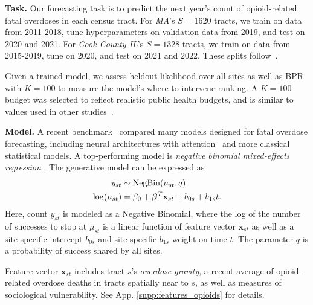 
\textbf{Task.} Our forecasting task is to predict the next year's count of opioid-related fatal overdoses in each census tract. For \emph{MA}'s $S{=}1620$ tracts, we train on data from 2011-2018, tune hyperparameters on validation data from 2019, and test on 2020 and 2021. For \emph{Cook County IL}'s $S{=}1328$ tracts, we train on data from 2015-2019, tune on 2020, and test on 2021 and 2022. 
These splits follow~\citet{heutonSpatiotemporalForecastingOpioidrelated2024}.

Given a trained model, we assess heldout likelihood over all sites as well as BPR with $K{=}100$ to measure the model's where-to-intervene ranking. A $K{=}100$ budget was selected to reflect realistic public health budgets, and is similar to values used in other studies~\citep{marshallPreventingOverdoseUsing2022}.



\textbf{Model.}
A recent benchmark~\citep{heutonSpatiotemporalForecastingOpioidrelated2024} compared many models designed for fatal overdose forecasting, including
neural architectures with attention~\citep{ertugrul_castnet_2019} and more classical statistical models. 
A top-performing model is \emph{negative binomial mixed-effects regression} \citep{marks_identifying_2021}.
The generative model can be expressed as
\begin{align}
    \label{eq:neg_binom_mixed_effects}
    y_{st} &\sim \text{NegBin}(\mu_{st}, q),
    \\ \notag
	\log(\mu_{st}) &= \beta_0 + \boldsymbol{\beta}^T\mathbf{x}_{st} + b_{0s} + b_{1s}t.
\end{align}
Here, count $y_{st}$ is modeled as a Negative Binomial, where the log of the number of successes to stop at $\mu_{st}$ is a linear function of feature vector $\mathbf{x}_{st}$ as well as a site-specific intercept $b_{0s}$ and site-specific $b_{1s}$ weight on time $t$. The parameter $q$ is a probability of success shared by all sites.

Feature vector $\boldsymbol{x}_{st}$ includes tract $s$'s \emph{overdose gravity}, a recent average of opioid-related overdose deaths in tracts spatially near to $s$, as well as measures of sociological vulnerability. See App. \ref{supp:features_opioids} for details.


